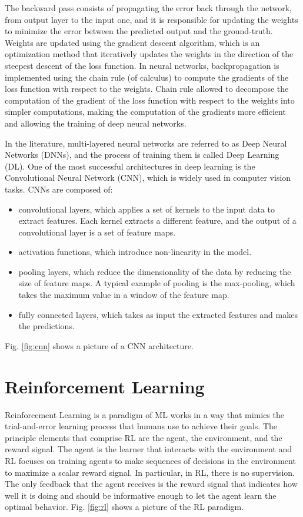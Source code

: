 The backward pass consists of propagating the error back through the network, from output layer to the input one, and it is responsible for updating the weights to minimize the error between the predicted output and the ground-truth.
Weights are updated using the gradient descent algorithm, which is an optimization method that iteratively updates the weights in the direction of the steepest descent of the loss function.
In neural networks, backpropagation is implemented using the chain rule (of calculus) to compute the gradients of the loss function with respect to the weights.
Chain rule allowed to decompose the computation of the gradient of the loss function with respect to the weights into simpler computations, making the computation of the gradients more efficient and allowing the training of deep neural networks.



In the literature, multi-layered neural networks are referred to as Deep Neural Networks (DNNs), and the process of training them is called Deep Learning (DL).
One of the most successful architectures in deep learning is the Convolutional Neural Network (CNN), which is widely used in computer vision tasks.
CNNs are composed of:
\begin{itemize}
    \item convolutional layers, which applies a set of kernels to the input data to extract features.
    Each kernel extracts a different feature, and the output of a convolutional layer is a set of feature maps.
    \item activation functions, which introduce non-linearity in the model.
    \item pooling layers, which reduce the dimensionality of the data by reducing the size of feature maps.
    A typical example of pooling is the max-pooling, which takes the maximum value in a window of the feature map.
    \item fully connected layers, which takes as input the extracted features and makes the predictions.
\end{itemize}

Fig. \ref{fig:cnn} shows a picture of a CNN architecture.


\section{Reinforcement Learning}
\label{sec:rl}
Reinforcement Learning is a paradigm of ML works in a way that mimics the trial-and-error learning process that humans use to achieve their goals.
The principle elements that comprise RL are the agent, the environment, and the reward signal.
The agent is the learner that interacts with the environment and RL focuses on training agents to make sequences of decisions in the environment to maximize a scalar reward signal.
In particular, in RL, there is no supervision.
The only feedback that the agent receives is the reward signal that indicates how well it is doing and should be informative enough to let the agent learn the optimal behavior.
Fig. \ref{fig:rl} shows a picture of the RL paradigm.

